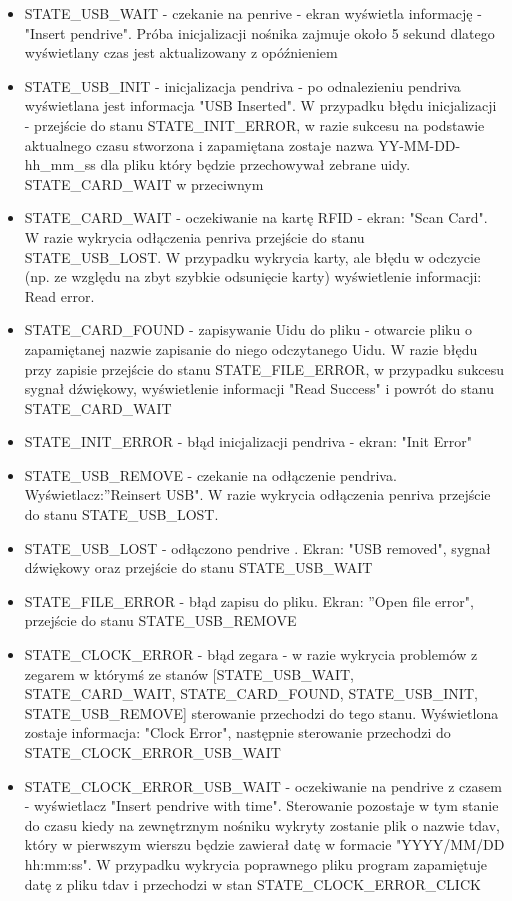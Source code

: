 \documentclass[declaration,shortabstract, mgr]{iithesis}
\begin{document}
\begin{itemize}
\item STATE\_USB\_WAIT - czekanie na penrive - ekran wyświetla informację -  "Insert pendrive". Próba inicjalizacji nośnika zajmuje około 5 sekund dlatego wyświetlany czas jest aktualizowany z opóźnieniem
\item STATE\_USB\_INIT - inicjalizacja pendriva - po odnalezieniu pendriva wyświetlana jest informacja "USB Inserted". W przypadku błędu inicjalizacji - przejście do stanu STATE\_INIT\_ERROR,  w razie sukcesu na podstawie aktualnego czasu stworzona i zapamiętana zostaje nazwa YY-MM-DD-hh\_mm\_ss dla pliku który będzie przechowywał zebrane uidy. STATE\_CARD\_WAIT w przeciwnym
\item STATE\_CARD\_WAIT - oczekiwanie na kartę RFID - ekran: "Scan Card". W razie wykrycia odłączenia penriva przejście do stanu STATE\_USB\_LOST. W przypadku wykrycia karty, ale błędu w odczycie (np. ze względu na zbyt szybkie odsunięcie karty) wyświetlenie informacji: Read error.
\item STATE\_CARD\_FOUND - zapisywanie Uidu do pliku - otwarcie pliku o zapamiętanej nazwie zapisanie do niego odczytanego Uidu. W razie błędu przy zapisie przejście do stanu STATE\_FILE\_ERROR, w przypadku sukcesu sygnał dźwiękowy, wyświetlenie informacji "Read Success" i powrót do stanu STATE\_CARD\_WAIT
\item STATE\_INIT\_ERROR - błąd inicjalizacji pendriva - ekran: "Init Error"
\item STATE\_USB\_REMOVE - czekanie na odłączenie pendriva. Wyświetlacz:''Reinsert USB". W razie wykrycia odłączenia penriva przejście do stanu STATE\_USB\_LOST.
\item STATE\_USB\_LOST - odłączono pendrive . Ekran: "USB removed", sygnał dźwiękowy oraz przejście do stanu STATE\_USB\_WAIT
\item STATE\_FILE\_ERROR - błąd zapisu do pliku. Ekran: ''Open file error", przejście do stanu STATE\_USB\_REMOVE
\item STATE\_CLOCK\_ERROR  - błąd zegara - w razie wykrycia problemów z zegarem w którymś ze stanów [STATE\_USB\_WAIT, STATE\_CARD\_WAIT, STATE\_CARD\_FOUND, STATE\_USB\_INIT, STATE\_USB\_REMOVE] sterowanie przechodzi do tego stanu. Wyświetlona zostaje informacja: "Clock Error", następnie sterowanie przechodzi do STATE\_CLOCK\_ERROR\_USB\_WAIT
\item STATE\_CLOCK\_ERROR\_USB\_WAIT - oczekiwanie na pendrive z czasem - wyświetlacz "Insert pendrive with time". Sterowanie pozostaje w tym stanie do czasu kiedy na zewnętrznym nośniku wykryty zostanie plik o nazwie tdav, który w pierwszym wierszu będzie zawierał datę w formacie "YYYY/MM/DD hh:mm:ss". W przypadku wykrycia poprawnego pliku program zapamiętuje datę z pliku tdav i przechodzi w stan STATE\_CLOCK\_ERROR\_CLICK\\

\end{itemize}
\end{document}
